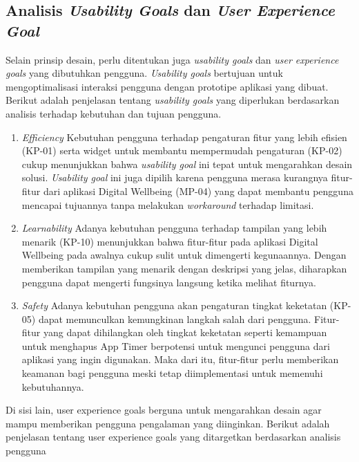 \subsection{Analisis \textit{Usability Goals} dan \textit{User Experience Goal}}

Selain prinsip desain, perlu ditentukan juga \textit{usability goals} dan \textit{user experience goals} yang dibutuhkan pengguna. \textit{Usability goals} bertujuan untuk mengoptimalisasi interaksi pengguna dengan prototipe aplikasi yang dibuat. Berikut adalah penjelasan tentang \textit{usability goals} yang diperlukan berdasarkan analisis terhadap kebutuhan dan tujuan pengguna.

\begin{enumerate}
  \item \textit{Efficiency}
  \subitem Kebutuhan pengguna terhadap pengaturan fitur yang lebih efisien (KP-01) serta widget untuk membantu mempermudah pengaturan (KP-02) cukup menunjukkan bahwa \textit{usability goal} ini tepat untuk mengarahkan desain solusi. \textit{Usability goal} ini juga dipilih karena pengguna merasa kurangnya fitur-fitur dari aplikasi Digital Wellbeing (MP-04) yang dapat membantu pengguna mencapai tujuannya tanpa melakukan \textit{workaround} terhadap limitasi.

  \item \textit{Learnability}
  \subitem Adanya kebutuhan pengguna terhadap tampilan yang lebih menarik (KP-10) menunjukkan bahwa fitur-fitur pada aplikasi Digital Wellbeing pada awalnya cukup sulit untuk dimengerti kegunaannya. Dengan memberikan tampilan yang menarik dengan deskripsi yang jelas, diharapkan pengguna dapat mengerti fungsinya langsung ketika melihat fiturnya.
  
  \item \textit{Safety}
  \subitem Adanya kebutuhan pengguna akan pengaturan tingkat keketatan (KP-05) dapat memunculkan kemungkinan langkah salah dari pengguna. Fitur-fitur yang dapat dihilangkan oleh tingkat keketatan seperti kemampuan untuk menghapus App Timer berpotensi untuk mengunci pengguna dari aplikasi yang ingin digunakan. Maka dari itu, fitur-fitur perlu memberikan keamanan bagi pengguna meski tetap diimplementasi untuk memenuhi kebutuhannya.

\end{enumerate}

Di sisi lain, user experience goals berguna untuk mengarahkan desain agar mampu memberikan pengguna pengalaman yang diinginkan. Berikut adalah penjelasan tentang user experience goals yang ditargetkan berdasarkan analisis pengguna

